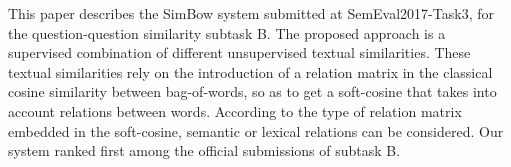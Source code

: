 This paper describes the SimBow system submitted at SemEval2017-Task3, for the question-question similarity subtask B. The proposed approach is a supervised combination of different unsupervised textual similarities. These textual similarities rely on the introduction of a relation matrix in the classical cosine similarity between bag-of-words, so as to get a soft-cosine that takes into account relations between words. According to the type of relation matrix embedded in the soft-cosine, semantic or lexical relations can be considered. Our system ranked first among the official submissions of subtask B.
